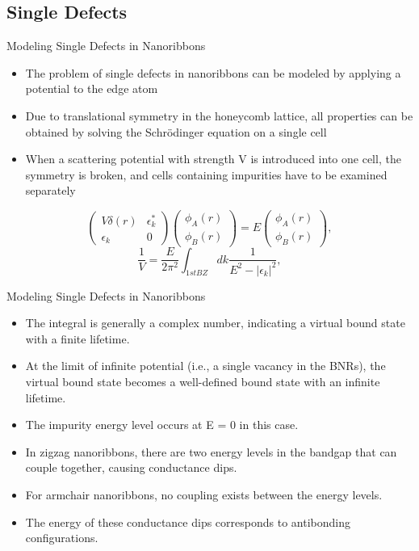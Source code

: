 \documentclass[handout,t]{beamer}
\begin{document}
\subsection{Single Defects}
\begin{frame}{Modeling Single Defects in Nanoribbons}
	\begin{itemize}
		\item The problem of single defects in nanoribbons can be modeled by applying a potential to the edge atom
		\item Due to translational symmetry in the honeycomb lattice, all properties can be obtained by solving the Schrödinger equation on a single cell
		\item When a scattering potential with strength V is introduced into one cell, the symmetry is broken, and cells containing impurities have to be examined separately
	\end{itemize}
	\begin{equation}
		\left(
		\begin{array}{cc}
		  V\delta(r)&\epsilon^{*}_{k}\\
		  \epsilon_k & 0
		\end{array}
		\right)
		\left(
		\begin{array}{c}
		  \phi_{A}(r)\\
		  \phi_{B}(r)
		\end{array}
		\right)
		=E
		\left(
		\begin{array}{c}
		  \phi_{A}(r)\\
		  \phi_{B}(r)
		\end{array}
		\right),
	  \end{equation}
	  \begin{equation}
		\frac{1}{V}=\frac{E}{2\pi^2}\int_{1st BZ}dk\frac{1}{E^2-|\epsilon_k|^2},
		\label{virtual}
	  \end{equation}
\end{frame}
\begin{frame}{Modeling Single Defects in Nanoribbons}
	\begin{itemize}
		\item The integral is generally a complex number, indicating a virtual bound state with a finite lifetime.
		\item At the limit of infinite potential (i.e., a single vacancy in the BNRs), the virtual bound state becomes a well-defined bound state with an infinite lifetime.
		\item The impurity energy level occurs at E = 0 in this case.
		\item In zigzag nanoribbons, there are two energy levels in the bandgap that can couple together, causing conductance dips.
		\item For armchair nanoribbons, no coupling exists between the energy levels.
		\item The energy of these conductance dips corresponds to antibonding configurations.
	\end{itemize}
\end{frame}
\end{document}
